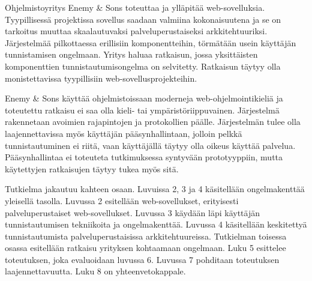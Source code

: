 Ohjelmistoyritys Enemy \& Sons toteuttaa ja ylläpitää web-sovelluksia. Tyypillisessä projektissa sovellus saadaan valmiina kokonaisuutena ja se on tarkoitus muuttaa skaalautuvaksi palveluperustaiseksi arkkitehtuuriksi. Järjestelmää pilkottaessa erillisiin komponentteihin, törmätään usein käyttäjän tunnistamisen ongelmaan. Yritys haluaa ratkaisun, jossa yksittäisten komponenttien tunnistautumisongelma on selvitetty. Ratkaisun täytyy olla monistettavissa tyypillisiin web-sovellusprojekteihin.

Enemy \& Sons käyttää ohjelmistoissaan moderneja web-ohjelmointikieliä ja toteutettu ratkaisu ei saa olla kieli- tai ympäristöriippuvainen. Järjestelmä rakennetaan avoimien rajapintojen ja protokollien päälle. Järjestelmän tulee olla laajennettavissa myös käyttäjän pääsynhallintaan, jolloin pelkkä tunnistautuminen ei riitä, vaan käyttäjällä täytyy olla oikeus käyttää palvelua. Pääsynhallintaa ei toteuteta tutkimuksessa syntyvään prototyyppiin, mutta käytettyjen ratkaisujen täytyy tukea myös sitä.

Tutkielma jakautuu kahteen osaan. Luvuissa 2, 3 ja 4 käsitellään ongelmakenttää yleisellä tasolla. Luvussa 2 esitellään web-sovellukset, erityisesti palveluperustaiset web-sovellukset. Luvussa 3 käydään läpi käyttäjän tunnistautumisen tekniikoita ja ongelmakenttää. Luvussa 4 käsitellään keskitettyä tunnistautumista palveluperustaisissa arkkitehtuureissa. Tutkielman toisessa osassa esitellään ratkaisu yrityksen kohtaamaan ongelmaan. Luku 5 esittelee toteutuksen, joka evaluoidaan luvussa 6. Luvussa 7 pohditaan toteutuksen laajennettavuutta. Luku 8 on yhteenvetokappale.
